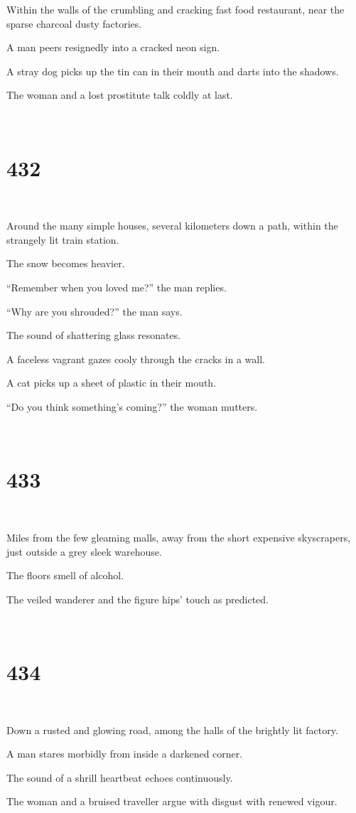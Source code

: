 \documentclass{report}
\begin{document}
Within the walls of the crumbling and cracking fast food restaurant, near the sparse charcoal dusty factories.

A man peers resignedly into a cracked neon sign.

A stray dog picks up the tin can in their mouth and darts into the shadows.

The woman and a lost prostitute talk coldly at last.

~
\chapter*{432}
~

Around the many simple houses, several kilometers down a path, within the strangely lit train station.

The snow becomes heavier.

``Remember when you loved me?'' the man replies.

``Why are you shrouded?'' the man says.

The sound of shattering glass resonates.

A faceless vagrant gazes cooly through the cracks in a wall.

A cat picks up a sheet of plastic in their mouth.

``Do you think something's coming?'' the woman mutters.

~
\chapter*{433}
~

Miles from the few gleaming malls, away from the short expensive skyscrapers, just outside a grey sleek warehouse.

The floors smell of alcohol.

The veiled wanderer and the figure hips' touch as predicted.

~
\chapter*{434}
~

Down a rusted and glowing road, among the halls of the brightly lit factory.

A man stares morbidly from inside a darkened corner.

The sound of a shrill heartbeat echoes continuously.

The woman and a bruised traveller argue with disgust with renewed vigour.
\end{document}
